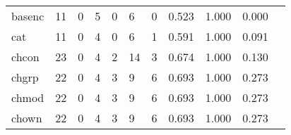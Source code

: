 \begin{longtable}{lp{1.2cm}p{1.2cm}p{1.2cm}p{1.2cm}p{1.2cm}p{1.2cm}p{1.2cm}p{1.2cm}p{1.2cm}p{1.2cm}}
basenc    &                                    11 &                                                  0 &                                                  5 &                                                  0 &                                                  6 &                                                  0 &                                              0.523 &                                              1.000 &                                              0.000 \\
cat       &                                    11 &                                                  0 &                                                  4 &                                                  0 &                                                  6 &                                                  1 &                                              0.591 &                                              1.000 &                                              0.091 \\
chcon     &                                    23 &                                                  0 &                                                  4 &                                                  2 &                                                 14 &                                                  3 &                                              0.674 &                                              1.000 &                                              0.130 \\
chgrp     &                                    22 &                                                  0 &                                                  4 &                                                  3 &                                                  9 &                                                  6 &                                              0.693 &                                              1.000 &                                              0.273 \\
chmod     &                                    22 &                                                  0 &                                                  4 &                                                  3 &                                                  9 &                                                  6 &                                              0.693 &                                              1.000 &                                              0.273 \\
chown     &                                    22 &                                                  0 &                                                  4 &                                                  3 &                                                  9 &                                                  6 &                                              0.693 &                                              1.000 &                                              0.273 \\

\end{longtable}
